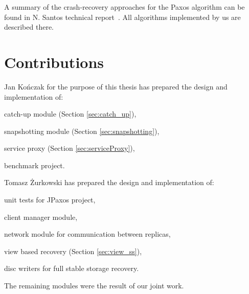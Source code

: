 A summary of the crash-recovery approaches for the Paxos algorithm can be found in N. Santos technical report~\cite{Nun10}. All algorithms implemented by us are described there.

\section{Contributions}

Jan Kończak for the purpose of this thesis has prepared the design and implementation of:
\begin{tightList}
  \item[\textbullet] catch-up module (Section \ref{sec:catch_up}),
  \item[\textbullet] snapshotting module (Section \ref{sec:snapshotting}),
  \item[\textbullet] service proxy  (Section \ref{sec:serviceProxy}),
  \item[\textbullet] benchmark project.
\end{tightList}

\noindent Tomasz Żurkowski has prepared the design and implementation of:
\begin{tightList}
  \item[\textbullet] unit tests for JPaxos project,
  \item[\textbullet] client manager module, 
  \item[\textbullet] network module for communication between replicas,
  \item[\textbullet] view based recovery (Section \ref{sec:view_ss}),
  \item[\textbullet] disc writers for full stable storage recovery.
\end{tightList}

\noindent The remaining modules were the result of our joint work.
